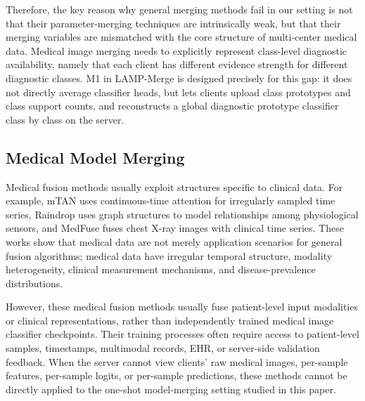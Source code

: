 \documentclass[letterpaper]{article}
\begin{document}
Therefore, the key reason why general merging methods fail in our setting is not that their parameter-merging techniques are intrinsically weak, but that their merging variables are mismatched with the core structure of multi-center medical data. Medical image merging needs to explicitly represent class-level diagnostic availability, namely that each client has different evidence strength for different diagnostic classes. M1 in LAMP-Merge is designed precisely for this gap: it does not directly average classifier heads, but lets clients upload class prototypes and class support counts, and reconstructs a global diagnostic prototype classifier class by class on the server.


\subsection{Medical Model Merging}

Medical fusion methods usually exploit structures specific to clinical data. For example, mTAN uses continuous-time attention for irregularly sampled time series, Raindrop uses graph structures to model relationships among physiological sensors, and MedFuse fuses chest X-ray images with clinical time series. These works show that medical data are not merely application scenarios for general fusion algorithms; medical data have irregular temporal structure, modality heterogeneity, clinical measurement mechanisms, and disease-prevalence distributions.


However, these medical fusion methods usually fuse patient-level input modalities or clinical representations, rather than independently trained medical image classifier checkpoints. Their training processes often require access to patient-level samples, timestamps, multimodal records, EHR, or server-side validation feedback. When the server cannot view clients' raw medical images, per-sample features, per-sample logits, or per-sample predictions, these methods cannot be directly applied to the one-shot model-merging setting studied in this paper.
\end{document}
